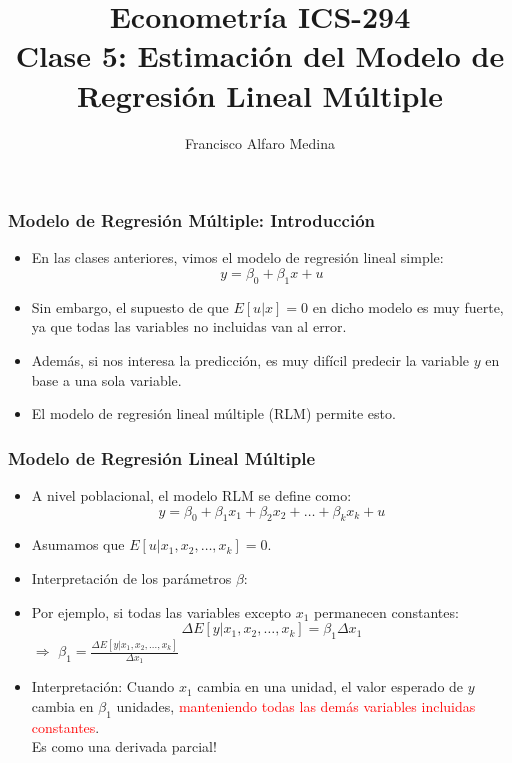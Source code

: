 \documentclass{beamer}
\title[ICS-162]{Econometría ICS-294\\ \small{Clase 5: Estimación del Modelo de Regresión Lineal Múltiple}}
\author{Francisco Alfaro Medina}
\institute[USM]
{Universidad Técnica Federico Santa María\\ %
	\medskip
	\textit{} %
	
}
\date{}
\begin{document}
	
\begin{frame}
	\titlepage %


\end{frame}




\begin{frame}
	\frametitle{Modelo de Regresión Múltiple: Introducción}
	\begin{itemize}
				\item En las clases anteriores, vimos el modelo de regresión lineal simple:
		\[ y = \beta_0 + \beta_1x + u \]
		\item Sin embargo, el supuesto de que $E[u|x] = 0$ en dicho modelo es muy fuerte, ya que todas las variables no incluidas van al error.
			\item Además, si nos interesa la predicción, es muy difícil predecir la variable $y$ en base a una sola variable.
		\item El modelo de regresión lineal múltiple (RLM) permite esto.
	\end{itemize}
\end{frame}
\begin{frame}
	\frametitle{Modelo de Regresión Lineal Múltiple}
	\begin{itemize}
		\item A nivel poblacional, el modelo RLM se define como:
		\[ y = \beta_0 + \beta_1x_1 + \beta_2x_2 + \ldots + \beta_kx_k + u \]
		\item Asumamos que $E[u|x_1, x_2, \ldots, x_k] = 0$.
		\item Interpretación de los parámetros $\beta$:
		\item Por ejemplo, si todas las variables excepto $x_1$ permanecen constantes:
		\[ \Delta E[y|x_1, x_2, \ldots, x_k] = \beta_1 \Delta x_1 \]
		$\Rightarrow$ $\beta_1 = \frac{\Delta E[y|x_1, x_2, \ldots, x_k]}{\Delta x_1}$
		\item Interpretación: Cuando $x_1$ cambia en una unidad, el valor esperado de $y$ cambia en $\beta_1$ unidades, \textcolor{red}{manteniendo todas las demás variables incluidas constantes}. \\ Es como una derivada parcial!
	\end{itemize}
\end{frame}
\end{document}
